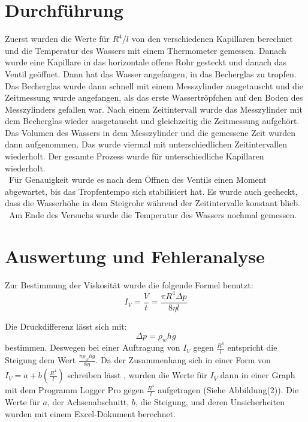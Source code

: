 \documentclass[11pt,a4paper]{article}
\begin{document}
\section{Durchführung}

Zuerst wurden die Werte für $R^{4}/l$ von den verschiedenen Kapillaren berechnet und die Temperatur des Wassers mit einem Thermometer gemessen. 
Danach wurde eine Kapillare in das horizontale offene Rohr gesteckt und danach das Ventil  geöffnet. Dann hat das Wasser angefangen, in das Becherglas zu tropfen. Das Becherglas wurde dann schnell mit einem Messzylinder ausgetauscht und die Zeitmessung wurde angefangen, als das erste Wassertröpfchen auf den Boden des Messzylinders gefallen war. Nach einem Zeitintervall wurde das Messzylinder mit dem Becherglas wieder ausgetauscht und gleichzeitig die Zeitmessung aufgehört. Das Volumen des Wassers in dem Messzylinder und die gemessene Zeit wurden dann aufgenommen. Das wurde viermal mit unterschiedlichen Zeitintervallen wiederholt. Der gesamte Prozess wurde für unterschiedliche Kapillaren wiederholt. 
\\\
Für Genauigkeit wurde es nach dem Öffnen des Ventils einen Moment abgewartet, bis das Tropfentempo sich stabilisiert hat. Es wurde auch gecheckt, dass die Wasserhöhe in dem Steigrohr während der Zeitintervalle konstant blieb.
\\\
Am Ende des Versuchs wurde die Temperatur des Wassers nochmal gemessen.

\section{Auswertung und Fehleranalyse}
Zur Bestimmung der Viskosität wurde die folgende Formel benutzt:
\begin{equation}
	I_V = \frac{V}{t} = \frac{\pi R^4 \Delta p}{8 \eta l}
\end{equation}

Die Druckdifferenz lässt sich mit:
$$\Delta p = \rho_w hg$$
bestimmen. Deswegen bei einer Auftragung von $I_V$ gegen $\frac{R^4}{l}$ entspricht die Steigung dem Wert $\frac{ \pi \rho_w hg}{8\eta}$.
Da der Zusammenhang sich in einer Form von $I_V = a + b(\frac{R^4}{l})$ schreiben lässt , wurden die Werte für $I_V$ dann in einer Graph mit dem Programm Logger Pro gegen $\frac{R^4}{l}$ aufgetragen (Siehe Abbildung(2)). Die Werte für $a$, der Achsenabschnitt, $b$, die Steigung, und deren Unsicherheiten wurden mit einem Excel-Dokument berechnet. 
\end{document}
